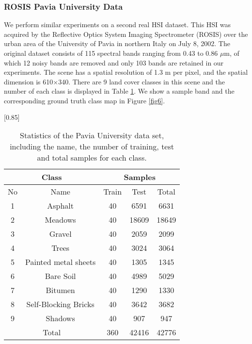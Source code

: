 \documentclass[journal]{IEEEtran}
\begin{document}
		\subsubsection{ROSIS Pavia University Data}
		We perform similar experiments on a second real HSI dataset. This HSI was acquired by the Reflective Optics System Imaging Spectrometer (ROSIS) over the urban area of the University of Pavia in northern Italy on July 8, 2002. The original dataset consists of 115 spectral bands ranging from 0.43 to 0.86 {{$\mu$m}}, of which 12 noisy bands are removed and only 103 bands are retained in our experiments. The scene has a spatial resolution of 1.3 {{m}} per pixel, and the spatial dimension is 610$\times$340. There are 9 land cover classes in this scene and the number of each class is displayed in Table \ref{table3}. We show a sample band and the corresponding ground truth class map in Figure  \ref{fig6}.
		
		
	\begin{table}[htp]
		\caption{\label{table3} Statistics of the Pavia University data set, including the name, the number of training, test and total samples for each class.}
		\begin{center}
			{\normalsize
			\scalebox{0.85}[0.85]
				{
					\begin{tabular}{|c|c|c|c|c|}
						\hline
						\multicolumn{2}{|c}{Class} & \multicolumn{3}{|c|}{Samples}\\
						\hline
						No & Name & Train & Test & Total\\
						\hline
						1 & Asphalt &	40 & 6591  & 6631  \\
2 & Meadows	&  40 & 18609  & 18649\\
3 & Gravel	& 40 & 2059  & 2099\\
4 & Trees	& 40 & 3024  & 3064\\
5 & Painted metal sheets &	40 & 1305 & 1345\\
6 & Bare Soil &	40 & 4989 & 5029\\
7 & Bitumen	& 40 & 1290 & 1330\\
8 & Self-Blocking Bricks &	40 & 3642 & 3682 \\
9 & Shadows & 40 & 907 & 947\\
						\hline
						\multicolumn{2}{|c|}{Total} & 360 & 42416 & 42776\\
						\hline
					\end{tabular}
				}
			}
		\end{center}
	\end{table}		
		
\end{document}
